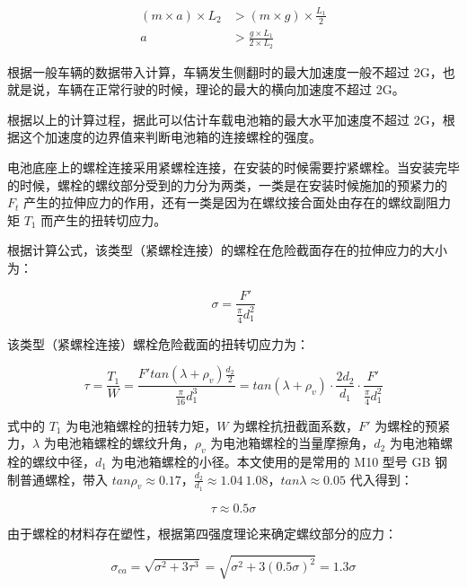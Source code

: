 \begin{equation}
\begin{aligned}
	\label{equ:fanche}
	(m \times a)\times L_2 &> (m \times g) \times \frac{L_1}{2} \\
	a &> \frac{g\times L_1}{2 \times L_2}
\end{aligned}
\end{equation}

根据一般车辆的数据带入计算，车辆发生侧翻时的最大加速度一般不超过 2G，也就是说，车辆在正常行驶的时候，理论的最大的横向加速度不超过 2G。

根据以上的计算过程，据此可以估计车载电池箱的最大水平加速度不超过 2G，根据这个加速度的边界值来判断电池箱的连接螺栓的强度。

电池底座上的螺栓连接采用紧螺栓连接，在安装的时候需要拧紧螺栓。当安装完毕的时候，螺栓的螺纹部分受到的力分为两类，一类是在安装时候施加的预紧力的 $F_t$ 产生的拉伸应力的作用，还有一类是因为在螺纹接合面处由存在的螺纹副阻力矩 $T_1$ 而产生的扭转切应力。

根据计算公式，该类型（紧螺栓连接）的螺栓在危险截面存在的拉伸应力的大小为：

\begin{equation}
	\sigma = \frac{F'}{\frac{\pi}{4}d_1^2}
\end{equation}

该类型（紧螺栓连接）螺栓危险截面的扭转切应力为：

\begin{equation}
	\tau=\frac{T_1}{W}=\frac{F'tan(\lambda+\rho_v)\frac{d_2}{2}}{\frac{\pi}{16}d_1^3}=tan(\lambda+\rho_v)\cdot \frac{2d_2}{d_1} \cdot \frac{F'}{\frac{\pi}{4}d_1^2}
\end{equation}

式中的 $T_1$ 为电池箱螺栓的扭转力矩，$W$ 为螺栓抗扭截面系数，$F'$ 为螺栓的预紧力，$\lambda$ 为电池箱螺栓的螺纹升角，$\rho_v$ 为电池箱螺栓的当量摩擦角，$d_2$ 为电池箱螺栓的螺纹中径，$d_1$ 为电池箱螺栓的小径。本文使用的是常用的 M10 型号 GB 钢制普通螺栓，带入 $tan\rho_v \approx 0.17$，$\frac{d_2}{d_1} \approx 1.04 ~ 1.08$，$tan\lambda \approx 0.05$ 代入得到：

\begin{equation}
	\tau \approx 0.5 \sigma
\end{equation}

由于螺栓的材料存在塑性，根据第四强度理论来确定螺纹部分的应力：

\begin{equation}
	\label{equ:1.3}
	\sigma_{ca}= \sqrt{\sigma^2+3\tau^3}=\sqrt{\sigma^2+3(0.5\sigma)^2}=1.3 \sigma
\end{equation}

